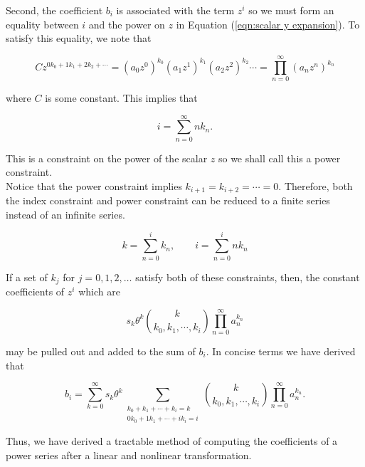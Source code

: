 Second, the coefficient $b_i$ is associated with the term $z^i$ so we must form an equality between $i$ and the power on $z$ in Equation (\ref{eqn:scalar y expansion}). To satisfy this equality, we note that

\begin{equation}
	C z^{0 k_0 + 1 k_1 + 2 k_2 + \cdots} = (a_0 z^0)^{k_0} (a_1 z^1)^{k_1} (a_2 z^2)^{k_2} \cdots = \prod_{n=0}^{\infty} (a_n z^n)^{k_n}
\end{equation}

where $C$ is some constant. This implies that

\begin{equation}
    i = \sum_{n=0}^{\infty} n k_n.
\end{equation}

This is a constraint on the power of the scalar $z$ so we shall call this a power constraint.\\

Notice that the power constraint implies $k_{i + 1} = k_{i + 2} = \cdots = 0$. Therefore, both the index constraint and power constraint can be reduced to a finite series instead of an infinite series.

\begin{equation}
	k = \sum_{n=0}^{i} k_n, \qquad i = \sum_{n=0}^{i} n k_n
\end{equation}

If a set of $k_j$ for $j = 0, 1, 2, \ldots$ satisfy both of these constraints, then, the constant coefficients of $z^i$ which are 

\begin{equation*}
    s_k \theta^k \binom{k}{k_0, k_1, \cdots, k_i} \prod_{n=0}^{\infty} a_n^{k_n}
\end{equation*}

may be pulled out and added to the sum of $b_i$. In concise terms we have derived that

\begin{equation}
    b_i = \sum_{k=0}^{\infty} s_k \theta^k \sum_{\substack{k_0 + k_1 + \cdots + k_i = k \\ 0 k_0 + 1 k_1 + \cdots + i k_i = i}} \binom{k}{k_0, k_1, \cdots, k_i} \prod_{n=0}^{\infty} a_n^{k_n}.
	\label{eqn:scalar power series result}
\end{equation}

Thus, we have derived a tractable method of computing the coefficients of a power series after a linear and nonlinear transformation.

